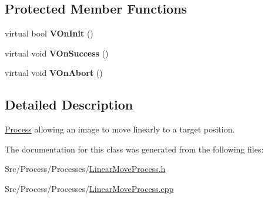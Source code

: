 \subsection*{Protected Member Functions}
\begin{DoxyCompactItemize}
\item 
\hypertarget{classLinearMoveProcess_a89192d3deef90ea2446c77f9fc183fea}{virtual bool {\bfseries V\-On\-Init} ()}\label{classLinearMoveProcess_a89192d3deef90ea2446c77f9fc183fea}

\item 
\hypertarget{classLinearMoveProcess_afc20e29b2dee02f65e11781f40a3b6ea}{virtual void {\bfseries V\-On\-Success} ()}\label{classLinearMoveProcess_afc20e29b2dee02f65e11781f40a3b6ea}

\item 
\hypertarget{classLinearMoveProcess_a44ba736d32a2fd956818f437e01e91e7}{virtual void {\bfseries V\-On\-Abort} ()}\label{classLinearMoveProcess_a44ba736d32a2fd956818f437e01e91e7}

\end{DoxyCompactItemize}


\subsection{Detailed Description}
\hyperlink{classProcess}{Process} allowing an image to move linearly to a target position. 

The documentation for this class was generated from the following files\-:\begin{DoxyCompactItemize}
\item 
Src/\-Process/\-Processes/\hyperlink{LinearMoveProcess_8h}{Linear\-Move\-Process.\-h}\item 
Src/\-Process/\-Processes/\hyperlink{LinearMoveProcess_8cpp}{Linear\-Move\-Process.\-cpp}\end{DoxyCompactItemize}
